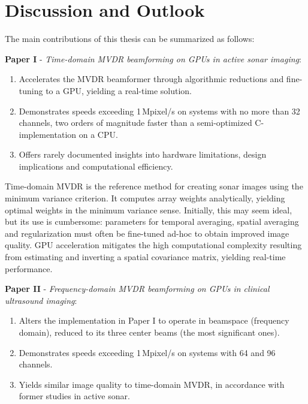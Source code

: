 
\endofdump

\ifRootBuild\else
  
  \makeglossaries
\fi



\chapter{Discussion and Outlook}

The main contributions of this thesis can be summarized as follows:

\textbf{Paper I} - \textit{Time-domain MVDR beamforming on GPUs in active sonar imaging}:
\begin{enumerate}
\item Accelerates the MVDR beamformer through algorithmic reductions and fine-tuning to a GPU, yielding a real-time solution.
\item Demonstrates speeds exceeding 1\,Mpixel/s on systems with no more than 32 channels, two orders of magnitude faster than a semi-optimized C-implementation on a CPU.
\item Offers rarely documented insights into hardware limitations, design implications and computational efficiency.
\end{enumerate}

Time-domain MVDR is the reference method for creating sonar images using the minimum variance criterion. It computes array weights analytically, yielding optimal weights in the minimum variance sense. Initially, this may seem ideal, but its use is cumbersome: parameters for temporal averaging, spatial averaging and regularization must often be fine-tuned ad-hoc to obtain improved image quality. GPU acceleration mitigates the high computational complexity resulting from estimating and inverting a spatial covariance matrix, yielding real-time performance.


\textbf{Paper II} - \textit{Frequency-domain MVDR beamforming on GPUs in clinical ultrasound imaging}:
\begin{enumerate}
\item Alters the implementation in Paper I to operate in beamspace (frequency domain), reduced to its three center beams (the most significant ones).
\item Demonstrates speeds exceeding 1\,Mpixel/s on systems with 64 and 96 channels.
\item Yields similar image quality to time-domain MVDR, in accordance with former studies in active sonar.
\end{enumerate}


